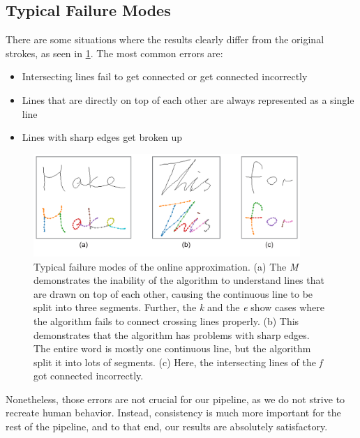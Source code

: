 \subsection{Typical Failure Modes}

There are some situations where the results clearly differ from the original strokes, as seen in \cref{fig:resamplingFailureModes}.
The most common errors are:

\begin{itemize}[topsep=0pt,itemsep=-1ex,partopsep=1ex,parsep=1ex]
\item Intersecting lines fail to get connected or get connected incorrectly
\item Lines that are directly on top of each other are always represented as a single line
\item Lines with sharp edges get broken up
\end{itemize}

\begin{figure}
  \centering
  \includegraphics[width=0.90\textwidth]{../assets/sampling/fails/fails.pdf}
  \caption[Typical failure modes of the online approximation]{Typical failure modes of the online approximation. (a) The \emph{M} demonstrates the inability of the algorithm to understand lines that are drawn on top of each other, causing the continuous line to be split into three segments. Further, the \emph{k} and the \emph{e} show cases where the algorithm fails to connect crossing lines properly. (b) This demonstrates that the algorithm has problems with sharp edges. The entire word is mostly one continuous line, but the algorithm split it into lots of segments. (c) Here, the intersecting lines of the \emph{f} got connected incorrectly.}
  \label{fig:resamplingFailureModes}
\end{figure}

Nonetheless, those errors are not crucial for our pipeline, as we do not strive to recreate human behavior. Instead, consistency is much more important for the rest of the pipeline, and to that end, our results are absolutely satisfactory.

